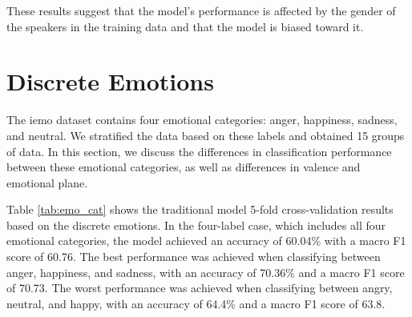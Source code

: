 These results suggest that the model's performance is affected by the gender of the speakers in the training data and that the model is biased toward it.


\section{Discrete Emotions}

The \ac{iemo} dataset contains four emotional categories: anger, happiness, sadness, and neutral. We stratified the data based on these labels and obtained 15 groups of data. In this section, we discuss the differences in classification performance between these emotional categories, as well as differences in valence and emotional plane.


Table \ref{tab:emo_cat} shows the traditional model 5-fold cross-validation results based on the discrete emotions. In the four-label case, which includes all four emotional categories, the model achieved an accuracy of 60.04\% with a macro F1 score of 60.76. The best performance was achieved when classifying between anger, happiness, and sadness, with an accuracy of 70.36\% and a macro F1 score of 70.73. The worst performance was achieved when classifying between angry, neutral, and happy, with an accuracy of 64.4\% and a macro F1 score of 63.8.


